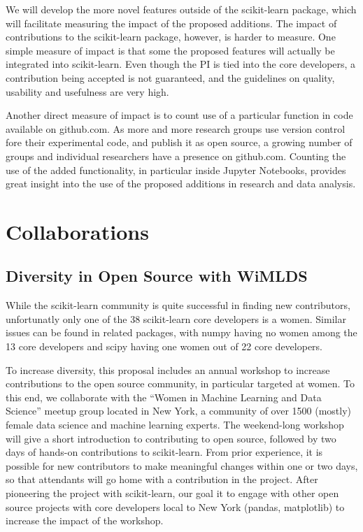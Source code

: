 We will develop the more novel features outside of the scikit-learn package, which will
facilitate measuring the impact of the proposed additions. The impact of contributions
to the scikit-learn package, however, is harder to measure. One simple measure of impact
is that some the proposed features will actually be integrated into scikit-learn.
Even though the PI is tied into the core developers, a contribution being accepted
is not guaranteed, and the guidelines on quality, usability and usefulness
are very high.

Another direct measure of impact is to count use of a particular function in
code available on github.com. As more and more research groups use version
control fore their experimental code, and publish it as open source, a growing
number of groups and individual researchers have a presence on github.com.
Counting the use of the added functionality, in particular inside Jupyter
Notebooks, provides great insight into the use of the proposed additions in
research and data analysis.


\section{Collaborations}
\subsection{Diversity in Open Source with WiMLDS}
While the scikit-learn community is quite successful in finding new contributors,
unfortunatly only one of the 38 scikit-learn core developers is a women.
Similar issues can be found in related packages, with numpy having no women among the 13 core
developers and scipy having one women out of 22 core developers.

To increase diversity, this proposal includes an annual workshop to increase
contributions to the open source community, in particular targeted at women.
To this end, we collaborate with the ``Women in Machine Learning and Data Science''
meetup group located in New York, a community of over 1500 (mostly) female data science and
machine learning experts.
The weekend-long workshop will give a short introduction to contributing to open source,
followed by two days of hands-on contributions to scikit-learn.
From prior experience, it is possible for new contributors to make meaningful changes
within one or two days, so that attendants will go home with a contribution
in the project. After pioneering the project with scikit-learn, our goal
it to engage with other open source projects with core developers local to New York
(pandas, matplotlib) to increase the impact of the workshop.

